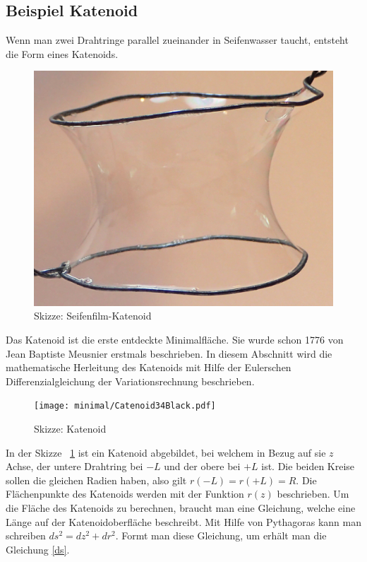 \begin{refsection}
\subsection{Beispiel Katenoid}
Wenn man zwei Drahtringe parallel zueinander in Seifenwasser taucht, entsteht die Form eines Katenoids. 
\begin{figure}
  \centering
  \includegraphics[scale=0.5]{minimal/Cartenoid_Foto.png}
  \caption{Skizze: Seifenfilm-Katenoid} 
\end{figure}
Das Katenoid ist die erste entdeckte Minimalfläche.
Sie wurde schon 1776 von Jean Baptiste Meusnier erstmals beschrieben.
In diesem Abschnitt wird die mathematische Herleitung des Katenoids mit Hilfe der Eulerschen Differenzialgleichung der Variationsrechnung beschrieben.
\begin{figure}
  \centering
  \texttt{[image: minimal/Catenoid34Black.pdf]}
  \caption{Skizze: Katenoid} 
  \label{Skizze: Katenoid}
\end{figure}
In der Skizze ~\ref{Skizze: Katenoid} ist ein Katenoid abgebildet, bei welchem in Bezug auf sie $z$ Achse, der untere Drahtring bei $-L$ und der obere bei $+L$ ist. 
Die beiden Kreise sollen die gleichen Radien haben, also gilt $r(-L)=r(+L)=R$. 
Die Flächenpunkte des Katenoids werden mit der Funktion $r(z)$ beschrieben. 
Um die Fläche des Katenoids zu berechnen, braucht man eine Gleichung, welche eine Länge auf der Katenoidoberfläche beschreibt. 
Mit Hilfe von Pythagoras kann man schreiben $ds^2=dz^2+dr^2$.
Formt man diese Gleichung, um erhält man die Gleichung \eqref{ds}.


\end{refsection}
